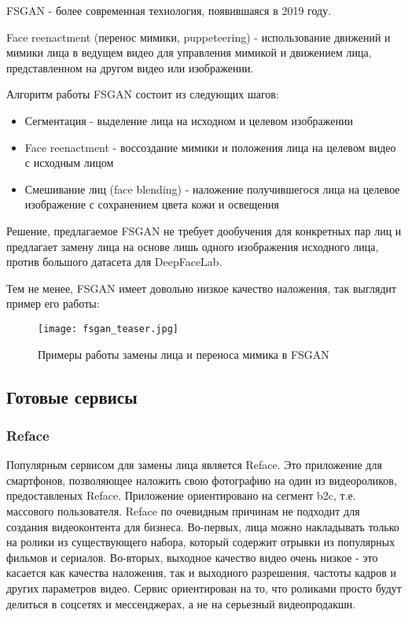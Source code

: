 FSGAN\cite{nirkin2019fsgan}\cite{nirkin2022fsganv2} - более современная технология, появившаяся в 2019 году.

Face reenactment (перенос мимики, puppeteering) - использование движений и мимики лица в ведущем видео для управления мимикой и движением лица, представленном на другом видео или изображении.

Алгоритм работы FSGAN состоит из следующих шагов:

\begin{itemize}
    \item Сегментация - выделение лица на исходном и целевом изображении
    \item Face reenactment - воссоздание мимики и положения лица на целевом видео с исходным лицом
    \item Смешивание лиц (face blending) - наложение получившегося лица на целевое изображение с сохранением цвета кожи и освещения
\end{itemize}

Решение, предлагаемое FSGAN не требует дообучения для конкретных пар лиц и предлагает замену лица на основе лишь одного изображения исходного лица, против большого датасета для DeepFaceLab.

Тем не менее, FSGAN имеет довольно низкое качество наложения, так выглядит пример его работы:

\begin{figure}[H]
    \centering
    \texttt{[image: fsgan\_teaser.jpg]}
    \caption{Примеры работы замены лица и переноса мимика в FSGAN} \label{fsgan_results}
\end{figure}

\subsection{Готовые сервисы}

\subsubsection{Reface}

Популярным сервисом для замены лица является Reface. Это приложение для смартфонов, позволяющее наложить свою фотографию на один из видеороликов, предоставленых Reface.
Приложение ориентировано на сегмент b2c, т.е. массового пользователя. Reface по очевидным причинам не подходит для создания видеоконтента для бизнеса.
Во-первых, лица можно накладывать только на ролики из существующего набора, который содержит отрывки из популярных фильмов и сериалов.
Во-вторых, выходное качество видео очень низкое - это касается как качества наложения, так и выходного разрешения, частоты кадров и других параметров видео.
Сервис ориентирован на то, что роликами просто будут делиться в соцсетях и мессенджерах, а не на серьезный видеопродакшн.

